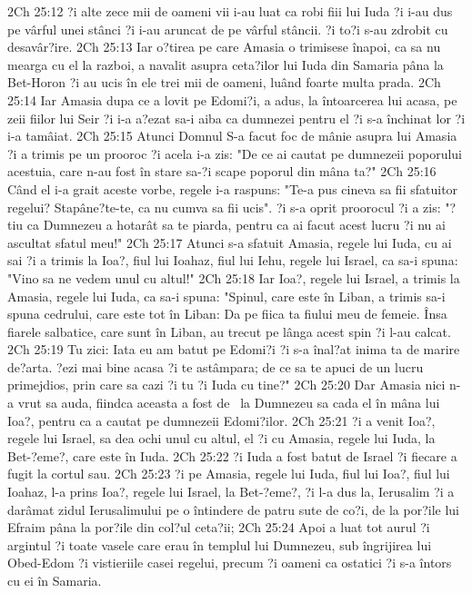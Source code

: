 2Ch 25:12  ?i alte zece mii de oameni vii i-au luat ca robi fiii lui Iuda ?i i-au dus pe vârful unei stânci ?i i-au aruncat de pe vârful stâncii. ?i to?i s-au zdrobit cu desavâr?ire.
2Ch 25:13  Iar o?tirea pe care Amasia o trimisese înapoi, ca sa nu mearga cu el la razboi, a navalit asupra ceta?ilor lui Iuda din Samaria pâna la Bet-Horon ?i au ucis în ele trei mii de oameni, luând foarte multa prada.
2Ch 25:14  Iar Amasia dupa ce a lovit pe Edomi?i, a adus, la întoarcerea lui acasa, pe zeii fiilor lui Seir ?i i-a a?ezat sa-i aiba ca dumnezei pentru el ?i s-a închinat lor ?i i-a tamâiat.
2Ch 25:15  Atunci Domnul S-a facut foc de mânie asupra lui Amasia ?i a trimis pe un prooroc ?i acela i-a zis: "De ce ai cautat pe dumnezeii poporului acestuia, care n-au fost în stare sa-?i scape poporul din mâna ta?"
2Ch 25:16  Când el i-a grait aceste vorbe, regele i-a raspuns: "Te-a pus cineva sa fii sfatuitor regelui? Stapâne?te-te, ca nu cumva sa fii ucis". ?i s-a oprit proorocul ?i a zis: "?tiu ca Dumnezeu a hotarât sa te piarda, pentru ca ai facut acest lucru ?i nu ai ascultat sfatul meu!"
2Ch 25:17  Atunci s-a sfatuit Amasia, regele lui Iuda, cu ai sai ?i a trimis la Ioa?, fiul lui Ioahaz, fiul lui Iehu, regele lui Israel, ca sa-i spuna: "Vino sa ne vedem unul cu altul!"
2Ch 25:18  Iar Ioa?, regele lui Israel, a trimis la Amasia, regele lui Iuda, ca sa-i spuna: "Spinul, care este în Liban, a trimis sa-i spuna cedrului, care este tot în Liban: Da pe fiica ta fiului meu de femeie. Însa fiarele salbatice, care sunt în Liban, au trecut pe lânga acest spin ?i l-au calcat.
2Ch 25:19  Tu zici: Iata eu am batut pe Edomi?i ?i s-a înal?at inima ta de marire de?arta. ?ezi mai bine acasa ?i te astâmpara; de ce sa te apuci de un lucru primejdios, prin care sa cazi ?i tu ?i Iuda cu tine?"
2Ch 25:20  Dar Amasia nici n-a vrut sa auda, fiindca aceasta a fost de  la Dumnezeu sa cada el în mâna lui Ioa?, pentru ca a cautat pe dumnezeii Edomi?ilor.
2Ch 25:21  ?i a venit Ioa?, regele lui Israel, sa dea ochi unul cu altul, el ?i cu Amasia, regele lui Iuda, la Bet-?eme?, care este în Iuda.
2Ch 25:22  ?i Iuda a fost batut de Israel ?i fiecare a fugit la cortul sau.
2Ch 25:23  ?i pe Amasia, regele lui Iuda, fiul lui Ioa?, fiul lui Ioahaz, l-a prins Ioa?, regele lui Israel, la Bet-?eme?, ?i l-a dus la, Ierusalim ?i a darâmat zidul Ierusalimului pe o întindere de patru sute de co?i, de la por?ile lui Efraim pâna la por?ile din col?ul ceta?ii;
2Ch 25:24  Apoi a luat tot aurul ?i argintul ?i toate vasele care erau în templul lui Dumnezeu, sub îngrijirea lui Obed-Edom ?i vistieriile casei regelui, precum ?i oameni ca ostatici ?i s-a întors cu ei în Samaria.
